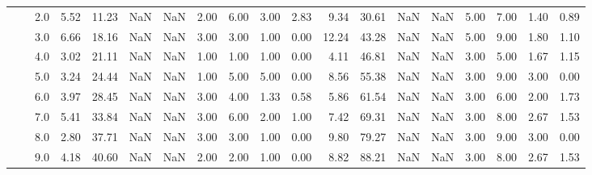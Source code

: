 \begin{tabular}{lllrrrrrrrrrrrrrrrr}
          &     & 2.0  &      5.52 &      11.23 &               NaN &                NaN &  2.00 &   6.00 &             3.00 &                         2.83 &      9.34 &      30.61 &               NaN &                NaN &  5.00 &   7.00 &             1.40 &                         0.89 \\
          &     & 3.0  &      6.66 &      18.16 &               NaN &                NaN &  3.00 &   3.00 &             1.00 &                         0.00 &     12.24 &      43.28 &               NaN &                NaN &  5.00 &   9.00 &             1.80 &                         1.10 \\
          &     & 4.0  &      3.02 &      21.11 &               NaN &                NaN &  1.00 &   1.00 &             1.00 &                         0.00 &      4.11 &      46.81 &               NaN &                NaN &  3.00 &   5.00 &             1.67 &                         1.15 \\
          &     & 5.0  &      3.24 &      24.44 &               NaN &                NaN &  1.00 &   5.00 &             5.00 &                         0.00 &      8.56 &      55.38 &               NaN &                NaN &  3.00 &   9.00 &             3.00 &                         0.00 \\
          &     & 6.0  &      3.97 &      28.45 &               NaN &                NaN &  3.00 &   4.00 &             1.33 &                         0.58 &      5.86 &      61.54 &               NaN &                NaN &  3.00 &   6.00 &             2.00 &                         1.73 \\
          &     & 7.0  &      5.41 &      33.84 &               NaN &                NaN &  3.00 &   6.00 &             2.00 &                         1.00 &      7.42 &      69.31 &               NaN &                NaN &  3.00 &   8.00 &             2.67 &                         1.53 \\
          &     & 8.0  &      2.80 &      37.71 &               NaN &                NaN &  3.00 &   3.00 &             1.00 &                         0.00 &      9.80 &      79.27 &               NaN &                NaN &  3.00 &   9.00 &             3.00 &                         0.00 \\
          &     & 9.0  &      4.18 &      40.60 &               NaN &                NaN &  2.00 &   2.00 &             1.00 &                         0.00 &      8.82 &      88.21 &               NaN &                NaN &  3.00 &   8.00 &             2.67 &                         1.53 \\

\end{tabular}

